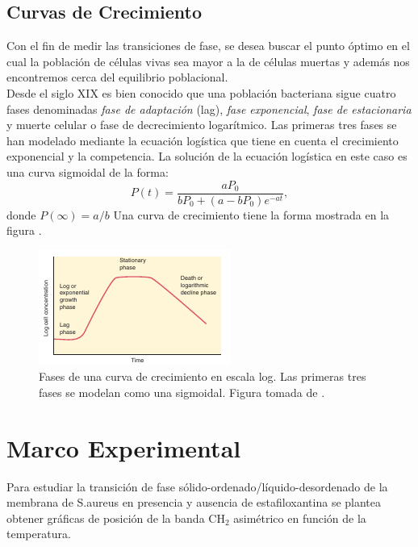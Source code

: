\documentclass[%
 reprint,
 amsmath,amssymb,
 aps,
]{revtex4-1}
\begin{document}
\subsection{Curvas de Crecimiento}
Con el fin de medir las transiciones de fase, se desea buscar el punto óptimo en el cual la población de células vivas sea mayor a la de células muertas y además nos encontremos cerca del equilibrio poblacional.\\
Desde el siglo XIX es bien conocido que una población bacteriana sigue cuatro fases \cite{Unknowna} denominadas \textit{fase de adaptación} (lag),  \textit{fase exponencial},  \textit{fase de estacionaria} y muerte celular o fase de decrecimiento logarítmico. Las primeras tres fases se han modelado mediante la ecuación logística \cite{Zill2009} que tiene en cuenta el crecimiento exponencial y la competencia. La solución de la ecuación logística en este caso es una curva sigmoidal de la forma:
\begin{equation}
    P(t)=\frac{aP_{0}}{bP_{0}+(a-bP_{0})e^{-at}},
\end{equation}\label{eq:2}
donde $P(\infty)=a/b$
Una curva de crecimiento tiene la forma mostrada en la figura .
\begin{figure}[h]
  \includegraphics[width=\linewidth]{curva.png}
  \caption{Fases de una curva de crecimiento en escala log. Las primeras tres fases se modelan como una sigmoidal. Figura tomada de \cite{Unknowna}.}
  \label{fig:curv}
\end{figure}
\section{\label{sec:exp}Marco Experimental}
Para estudiar la transición de fase sólido-ordenado/líquido-desordenado de la membrana de S.aureus en presencia y ausencia de estafiloxantina se plantea obtener gráficas de posición de la banda CH$_{2}$ asimétrico en función de la temperatura.
\end{document}
